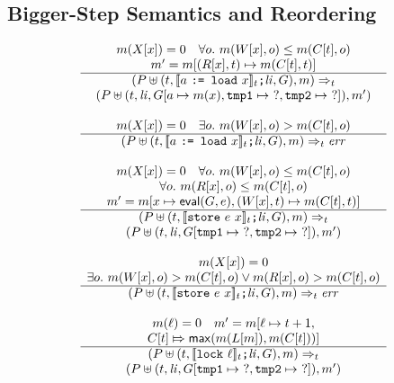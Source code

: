 \documentclass[preprint, 10pt]{sigplanconf}
\newcommand{\meanl}{\ensuremath{[ \! [}}
\newcommand{\meanr}{\ensuremath{] \! ]}}
\newcommand{\means}[1]{\ensuremath{\meanl #1 \meanr}}
\newcommand{\load}[2]{#1\ \texttt{:= load}\ #2}
\newcommand{\store}[2]{\texttt{store}\ #2\ #1}
\newcommand{\lock}[1]{\texttt{lock}\ #1}
\newcommand{\instr}[2]{\ensuremath{\means{#2}_{#1}}}
\newcommand{\cfg}[2]{\ensuremath{(#1, #2)}}
\begin{document}
\subsection{Bigger-Step Semantics and Reordering}
\begin{figure}[htb]
\[
\begin{array}{c}

\multicolumn{1}{c}{m(X[x]) = 0 \quad \forall o.\ m(W[x], o) \le m(C[t], o)}
\\
\multicolumn{1}{c}{m' = m[(R[x], t) \mapsto m(C[t], t)]}
\\
\hline
\cfg{P \uplus (t, \instr{t}{\load{a}{x}}\texttt{;} \mathit{li}, G)}{m}
\Rightarrow_{t} \\
\cfg{P \uplus (t, \mathit{li}, G[a \mapsto m(x), \texttt{tmp1} \mapsto\ ?, \texttt{tmp2} \mapsto\ ?])}{m'}
\\\\

\multicolumn{1}{c}{m(X[x]) = 0 \quad \exists o.\ m(W[x], o) > m(C[t], o)}
\\
\hline
\cfg{P \uplus (t, \instr{t}{\load{a}{x}}\texttt{;} \mathit{li}, G)}{m}
\Rightarrow_{t} \mathit{err}
\\\\

\multicolumn{1}{c}{m(X[x]) = 0 \quad \forall o.\ m(W[x], o) \le m(C[t], o)}
\\
\multicolumn{1}{c}{\forall o.\ m(R[x], o) \le m(C[t], o)}
\\
\multicolumn{1}{c}{m' = m[x \mapsto \mathsf{eval}(G, e), (W[x], t) \mapsto m(C[t], t)]}
\\
\hline
\cfg{P \uplus (t, \instr{t}{\store{x}{e}}\texttt{;} \mathit{li}, G)}{m}
\Rightarrow_{t} \\
\cfg{P \uplus (t, \mathit{li}, G[\texttt{tmp1} \mapsto\ ?, \texttt{tmp2} \mapsto\ ?])}{m'}
\\\\

\multicolumn{1}{c}{m(X[x]) = 0}
\\
\multicolumn{1}{c}{\exists o.\ m(W[x], o) > m(C[t], o) \vee m(R[x], o) > m(C[t], o)}
\\
\hline
\cfg{P \uplus (t, \instr{t}{\store{x}{e}}\texttt{;} \mathit{li}, G)}{m}
\Rightarrow_{t} \mathit{err}
\\\\

\multicolumn{1}{c}{m(\ell) = 0 \quad m' = m[\ell \mapsto t + 1,}
\\
\multicolumn{1}{c}{ C[t] \Mapsto \mathsf{max}(m(L[m]), m(C[t]))]}
\\
\hline
\cfg{P \uplus (t, \instr{t}{\lock{\ell}}\texttt{;} \mathit{li}, G)}{m}
\Rightarrow_{t} \\
\cfg{P \uplus (t, \mathit{li}, G[\texttt{tmp1} \mapsto\ ?, \texttt{tmp2} \mapsto\ ?])}{m'}
\\\\


\end{array}\]
\end{figure}
\end{document}
